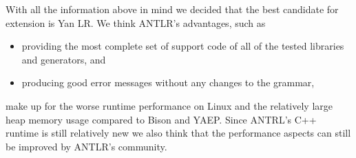 With all the information above in mind we decided that the best candidate for extension is Yan LR. We think ANTLR’s advantages, such as

\begin{itemize}
  \item providing the most complete set of support code of all of the tested libraries and generators, and
  \item producing good error messages without any changes to the grammar,
\end{itemize}

make up for the worse runtime performance on Linux and the relatively large heap memory usage compared to Bison and YAEP. Since ANTRL’s C++ runtime is still relatively new we also think that the performance aspects can still be improved by ANTLR’s community.
